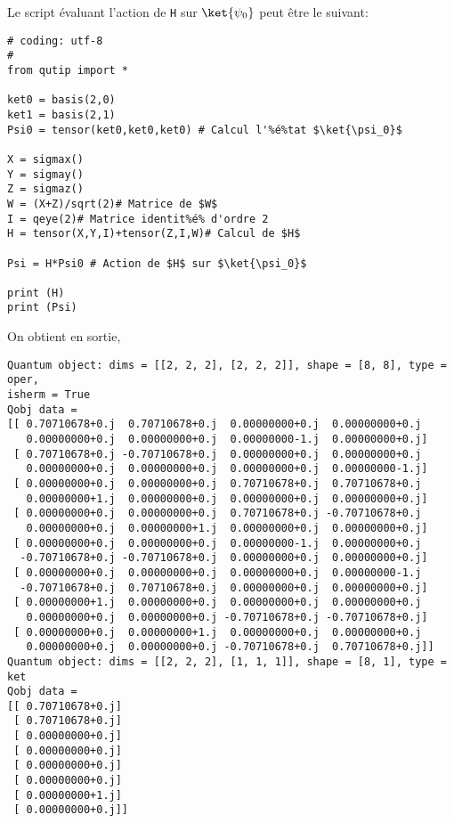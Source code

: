 Le script évaluant l'action de \texttt{H} sur $\ket{\psi_0}$ peut être le 
suivant:\\
\begin{lstlisting}[commentstyle=\scriptsize]
# coding: utf-8 
#
from qutip import *

ket0 = basis(2,0)
ket1 = basis(2,1)
Psi0 = tensor(ket0,ket0,ket0) # Calcul l'%é%tat $\ket{\psi_0}$

X = sigmax()
Y = sigmay()
Z = sigmaz()
W = (X+Z)/sqrt(2)# Matrice de $W$
I = qeye(2)# Matrice identit%é% d'ordre 2
H = tensor(X,Y,I)+tensor(Z,I,W)# Calcul de $H$

Psi = H*Psi0 # Action de $H$ sur $\ket{\psi_0}$

print (H)
print (Psi)
\end{lstlisting}
On obtient en sortie,
\begin{lstlisting}
Quantum object: dims = [[2, 2, 2], [2, 2, 2]], shape = [8, 8], type = oper, 
isherm = True
Qobj data =
[[ 0.70710678+0.j  0.70710678+0.j  0.00000000+0.j  0.00000000+0.j
   0.00000000+0.j  0.00000000+0.j  0.00000000-1.j  0.00000000+0.j]
 [ 0.70710678+0.j -0.70710678+0.j  0.00000000+0.j  0.00000000+0.j
   0.00000000+0.j  0.00000000+0.j  0.00000000+0.j  0.00000000-1.j]
 [ 0.00000000+0.j  0.00000000+0.j  0.70710678+0.j  0.70710678+0.j
   0.00000000+1.j  0.00000000+0.j  0.00000000+0.j  0.00000000+0.j]
 [ 0.00000000+0.j  0.00000000+0.j  0.70710678+0.j -0.70710678+0.j
   0.00000000+0.j  0.00000000+1.j  0.00000000+0.j  0.00000000+0.j]
 [ 0.00000000+0.j  0.00000000+0.j  0.00000000-1.j  0.00000000+0.j
  -0.70710678+0.j -0.70710678+0.j  0.00000000+0.j  0.00000000+0.j]
 [ 0.00000000+0.j  0.00000000+0.j  0.00000000+0.j  0.00000000-1.j
  -0.70710678+0.j  0.70710678+0.j  0.00000000+0.j  0.00000000+0.j]
 [ 0.00000000+1.j  0.00000000+0.j  0.00000000+0.j  0.00000000+0.j
   0.00000000+0.j  0.00000000+0.j -0.70710678+0.j -0.70710678+0.j]
 [ 0.00000000+0.j  0.00000000+1.j  0.00000000+0.j  0.00000000+0.j
   0.00000000+0.j  0.00000000+0.j -0.70710678+0.j  0.70710678+0.j]]
Quantum object: dims = [[2, 2, 2], [1, 1, 1]], shape = [8, 1], type = ket
Qobj data =
[[ 0.70710678+0.j]
 [ 0.70710678+0.j]
 [ 0.00000000+0.j]
 [ 0.00000000+0.j]
 [ 0.00000000+0.j]
 [ 0.00000000+0.j]
 [ 0.00000000+1.j]
 [ 0.00000000+0.j]]
\end{lstlisting}

